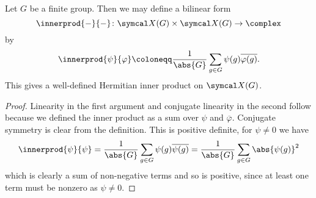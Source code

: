 \begin{lma}{}{}
    Let \(G\) be a finite group.
    Then we may define a bilinear form
    \begin{equation}
        \innerprod{-}{-} \colon \classFunctions(G) \times \classFunctions(G) \to \complex
    \end{equation}
    by
    \begin{equation}
        \innerprod{\psi}{\varphi} \coloneqq \frac{1}{\abs{G}} \sum_{g \in G} \psi(g) \overline{\varphi(g)}.
    \end{equation}
    This gives a well-defined Hermitian inner product on \(\classFunctions(G)\).
    \begin{proof}
        Linearity in the first argument and conjugate linearity in the second follow because we defined the inner product as a sum over \(\psi\) and \(\overline{\varphi}\).
        Conjugate symmetry is clear from the definition.
        This is positive definite, for \(\psi \ne 0\) we have
        \begin{equation}
            \innerprod{\psi}{\psi} = \frac{1}{\abs{G}} \sum_{g \in G} \psi(g)\overline{\psi(g)} = \frac{1}{\abs{G}} \sum_{g \in G} \abs{\psi(g)}^2
        \end{equation}
        which is clearly a sum of non-negative terms and so is positive, since at least one term must be nonzero as \(\psi \ne 0\).
    \end{proof}
\end{lma}

